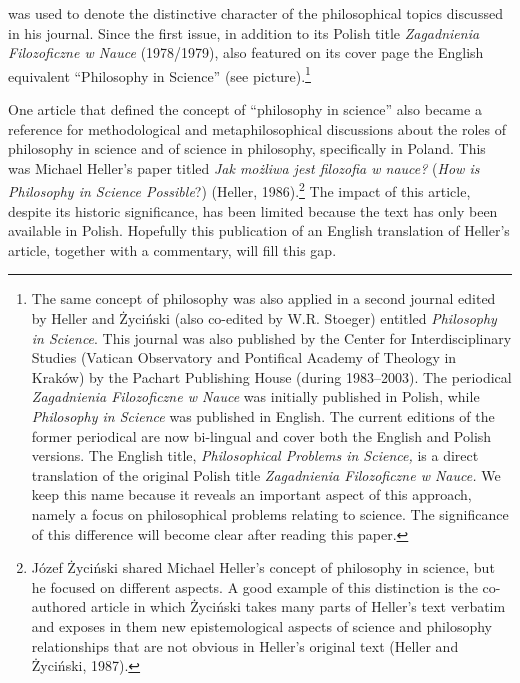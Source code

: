 \documentclass[a4paper]{article}
\begin{document}
was used to denote the distinctive character of the philosophical topics discussed in his journal. Since the first
issue, in addition to its Polish title \textit{Zagadnienia Filozoficzne w Nauce }(1978/1979), also featured on its
cover page the English equivalent “Philosophy in Science” (see picture).\footnote{The same concept of philosophy was
also applied in a second journal edited by Heller and Życiński (also co-edited by W.R. Stoeger) entitled
\textit{Philosophy in Science}. This journal was also published by the Center for Interdisciplinary Studies (Vatican
Observatory and Pontifical Academy of Theology in Kraków) by the Pachart Publishing House (during 1983–2003). The
periodical \textit{Zagadnienia Filozoficzne w Nauce }was initially published in Polish, while \textit{Philosophy in
Science }was published in English. The current editions of the former periodical are now bi-lingual and cover both the
English and Polish versions. The English title, \textit{Philosophical Problems in Science, }is a direct translation of
the original Polish title \textit{Zagadnienia Filozoficzne w Nauce. }We keep this name because it reveals an important
aspect of this approach, namely a focus on philosophical problems relating to science. The significance of this
difference will become clear after reading this paper.}

One article that defined the concept of “philosophy in science” also became a reference for methodological and
metaphilosophical discussions about the roles of philosophy in science and of science in philosophy, specifically in
Poland. This was Michael Heller’s paper titled \textit{Jak możliwa jest filozofia w nauce?} (\textit{How is Philosophy
in Science Possible}?) \label{ref:RNDrCU7rgcyDR}(Heller, 1986).\footnote{Józef Życiński shared Michael Heller's concept
of philosophy in science, but he focused on different aspects. A good example of this distinction is the co-authored
article in which Życiński takes many parts of Heller's text verbatim and exposes in them new epistemological aspects of
science and philosophy relationships that are not obvious in Heller’s original text \label{ref:RNDzM7nNfibOc}(Heller
and Życiński, 1987).} The impact of this article, despite its historic significance, has been limited because the text
has only been available in Polish. Hopefully this publication of an English translation of Heller’s article, together
with a commentary, will fill this gap.
\end{document}
